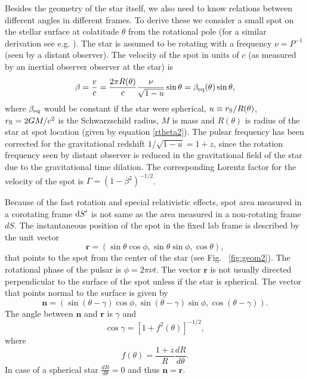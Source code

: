 \documentclass{wihuri}
\def\rg{r_{\rm S}} %
\def\be{\begin{equation}}
\def\ee{\end{equation}}
\def\d{{\rm d}}
\def\rg{r_{\rm S}} %
\newcommand{\bmath}[1]{\boldsymbol{#1}}
\begin{document}
Besides the geometry of the star itself, we also need to know relations between different angles in different frames. To derive these we consider a small spot on the stellar surface at colatitude $\theta$ from the rotational pole (for a similar derivation see e.g. \cite{poutabelo}). 
The star is assumed to be rotating  with a frequency $\nu=P^{-1}$ (seen by a distant observer).
The velocity of the spot in units of $c$ (as measured by an inertial observer observer at the star) is 
\begin{equation}
\label{beta2}
\beta = \frac{v}{c}=\frac{2\pi R(\theta)}{c} \frac{\nu}{\sqrt{1-u}} \sin\theta =\beta_{\rm eq}(\theta) \sin\theta,
\end{equation}
where $\beta_{\rm eq}$ would be constant if the star were spherical, $u\equiv\rg/R(\theta)$, 
$\rg=2GM/c^2$ is the Schwarzschild radius, $M$ is mass and $R(\theta)$ is
radius of the star at spot location (given by equation \ref{rtheta2}). The pulsar frequency has been corrected for the gravitational redshift $1/\sqrt{1-u}=1+z$, since the rotation frequency seen by distant observer is reduced in the gravitational field of the star due to the gravitational time dilation. The corresponding Lorentz factor for the velocity of the spot is $\Gamma=(1-\beta^2)^{-1/2}$.

Because of the fast rotation and special relativistic effects, spot area measured in a corotating frame $\d S^\prime$ is not same as the area measured in a non-rotating frame $dS$. The instantaneous position of the spot in the fixed lab frame is described by the unit vector 
\begin{equation}
\bmath{r}=(\sin\theta\cos\phi, \sin\theta\sin\phi, \cos\theta),
\end{equation}
that points to the spot from the center of the star (see Fig. ~\ref{fig:geom2}). The rotational phase of the pulsar is $\phi=2\pi\nu t$. The vector $\bmath{r}$ is not usually directed perpendicular to the surface of the spot unless if the star is spherical. The vector that points normal to the surface is given by
\begin{equation}
\bmath{n}=(\sin(\theta-\gamma)\cos\phi, \sin(\theta-\gamma)\sin\phi, \cos(\theta-\gamma)).
\end{equation}
The angle between $\bmath{n}$ and $\bmath{r}$ is $\gamma$ and 
\begin{equation}
\cos\gamma=[1+f^{2}(\theta)]^{-1/2},
\end{equation}
where
\be \label{eq:ftheta}
f(\theta)=\frac{1+z}{R}\frac{dR}{d\theta}.
\ee
In case of a spherical star $\frac{dR}{d\theta} = 0$ and thus $\bmath{n} = \bmath{r}$.
\end{document}
